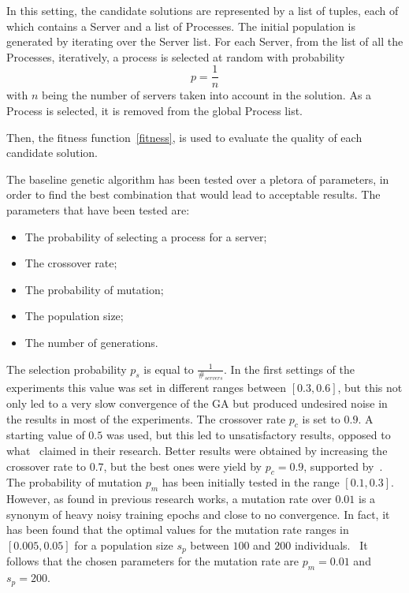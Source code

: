 In this setting, the candidate solutions are represented by a list of tuples, each of which contains a Server and a list of Processes.
The initial population is generated by iterating over the Server list. 
For each Server, from the list of all the Processes, iteratively, a process is selected at random with probability $$p = \frac{1}{n}$$
with $n$ being the number of servers taken into account in the solution. As a Process is selected, it is removed from the global Process list.

Then, the fitness function~\eqref{fitness}, is used to evaluate the quality of each candidate solution.

The baseline genetic algorithm has been tested over a pletora of parameters, in order to find the best combination that would lead to acceptable results.
The parameters that have been tested are:
\begin{itemize}
    \item The probability of selecting a process for a server;
    \item The crossover rate;
    \item The probability of mutation;
    \item The population size;
    \item The number of generations.
\end{itemize}

The selection probability $p_s$ is equal to $\frac{1}{\#_{servers}}$. In the first settings of the experiments this value was 
set in different ranges between $[0.3, 0.6]$, but this not only led to a very slow convergence of the GA but produced undesired noise
in the results in most of the experiments.
The crossover rate $p_c$ is set to $0.9$. A starting value of $0.5$ was used, but this led to unsatisfactory results, opposed to what~\cite{mirjalili2019genetic} claimed
in their research.
Better results were obtained by increasing the crossover rate to $0.7$, but the best ones were yield by $p_c = 0.9$, supported by~\cite{hassanat2019choosing}.
The probability of mutation $p_m$ has been initially tested in the range $[0.1, 0.3]$. However, as found in previous research works,
a mutation rate over $0.01$ is a synonym of heavy noisy training epochs and close to no convergence. In fact, it has been found that 
the optimal values for the mutation rate ranges in $[0.005, 0.05]$ for a population size $s_p$ between $100$ and $200$ individuals.~\cite{patil2015optimal}
It follows that the chosen parameters for the mutation rate are $p_m = 0.01$ and $s_p = 200$.


